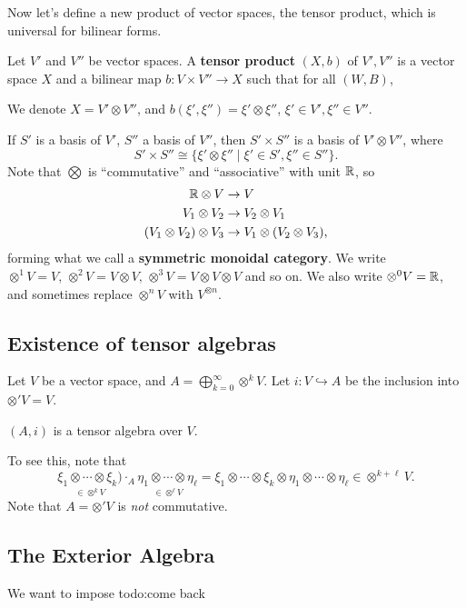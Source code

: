 Now let's define a new product of vector spaces, the tensor product, which is universal for bilinear forms.
\begin{definition}[]
    Let $V'$ and $V''$ be vector spaces. A \textbf{tensor product} $(X,b)$ of $V',V''$ is a vector space $X$ and a bilinear map $b \colon V\times V'' \to X$ such that for all $(W,B)$,
    \begin{figure}[H]
    \centering
    \end{figure}We denote $X= V'\otimes V''$, and $b(\xi',\xi'')=\xi'\otimes \xi''$, $\xi' \in V', \xi'' \in V''$.
\end{definition}
If $S'$ is a basis of $V'$, $S''$ a basis of $V''$, then $S' \times S''$ is a basis of $V' \otimes V''$, where \[
S' \times S'' \cong \{\xi' \otimes \xi'' \mid \xi' \in S',\xi''\in S''\} . 
\] Note that $\bigotimes$ is ``commutative'' and ``associative'' with unit $\mathbb{R}$, so 
\begin{align*}
    \mathbb{R}\otimes V & \to V\\
    V_1\otimes V_2 & \to V_2\otimes V_1\\
    (V_1\otimes V_2)\otimes V_3& \to V_1\otimes (V_2\otimes V_3),
\end{align*}forming what we call a \textbf{symmetric monoidal category}. We write $\otimes ^1 V=V,\,\otimes ^2 V=V\otimes V,\,\otimes ^3V=V\otimes V\otimes V$ and so on. We also write $\otimes ^0 V=\mathbb{R}$, and sometimes replace $\otimes ^n V$ with $V^{\otimes n}$. 

\subsection{Existence of tensor algebras}
Let $V$ be a vector space, and $A= \bigoplus _{k=0}^{\infty}\otimes^k V$. Let $i \colon V \hookrightarrow A$ be the inclusion into $\otimes 'V=V$.
\begin{claim}
    $(A,i)$ is a tensor algebra over $V$. 
\end{claim}To see this, note that\[
\underset{\in \otimes ^k V}{\xi_1\otimes \cdots \otimes \xi_k)} \cdot _{A}\underset{\in \otimes ^{\ell}V}{\eta_1\otimes \cdots \otimes \eta _{\ell}} = \xi_1\otimes \cdots \otimes \xi_k \otimes \eta_1\otimes \cdots \otimes \eta _{\ell} \in \otimes ^{k+\ell}V.
\] Note that $A=\otimes' V$ is \emph{not} commutative.

\subsection{The Exterior Algebra}
We want to impose {\color{red}todo:come back} 

